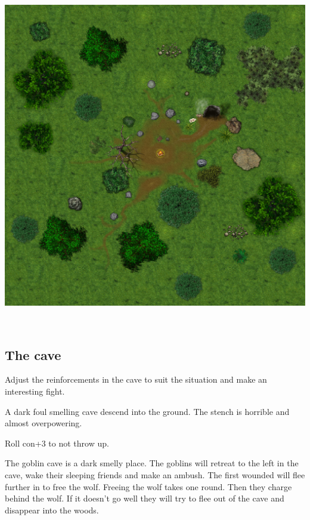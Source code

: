 \begin{center}
\includegraphics[width=1.0\linewidth]{./maps/goblin-camp-(32+0+0).jpg}
\end{center}

\




\subsection*{The cave}
Adjust the reinforcements in the cave to suit the situation and make an interesting fight.

\begin{readoutloud}
A dark foul smelling cave descend into the ground. The stench is horrible and almost overpowering.
\end{readoutloud}

Roll con+3 to not throw up.

The goblin cave is a dark smelly place.
The goblins will retreat to the left in the cave, wake their sleeping friends and make an ambush. The first wounded will flee further in to free the wolf. Freeing the wolf takes one round. Then they charge behind the wolf. If it doesn't go well they will try to flee out of the cave and disappear into the woods.

